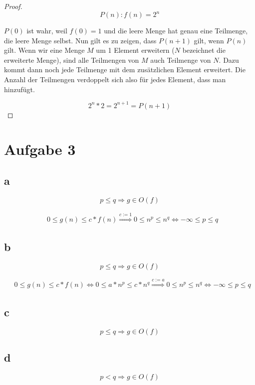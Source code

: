 \documentclass[a4paper,10pt]{article}
\begin{document}
\begin{proof}
 \begin{equation*}
  P(n): f(n) = 2^n
 \end{equation*}

 $P(0)$ ist wahr, weil $f(0) = 1$ und die leere Menge hat genau eine Teilmenge, die leere Menge selbst.
 Nun gilt es zu zeigen, dass $P(n + 1)$ gilt, wenn $P(n)$ gilt.
 Wenn wir eine Menge $M$ um 1 Element erweitern ($N$ bezeichnet die erweiterte Menge), sind alle Teilmengen von $M$ auch Teilmenge von $N$.
 Dazu kommt dann noch jede Teilmenge mit dem zusätzlichen Element erweitert.
 Die Anzahl der Teilmengen verdoppelt sich also für jedes Element, dass man hinzufügt.

 \begin{equation*}
  2^n * 2 = 2^{n + 1} = P(n + 1)
 \end{equation*}
\end{proof}

\section*{Aufgabe 3}

\subsection*{a}

\begin{equation*}
 p \le q \Rightarrow g \in O(f)
\end{equation*}

\begin{align*}
 & 0 \le g(n) \le c * f(n)
 \overset{c := 1}{\Rightarrow} 0 \le n^p \le n^q
 \Leftrightarrow -\infty \le p \le q
\end{align*}

\subsection*{b}

\begin{equation*}
 p \le q \Rightarrow g \in O(f)
\end{equation*}

\begin{align*}
 & 0 \le g(n) \le c * f(n)
 \Leftrightarrow 0 \le a * n^p \le c * n^q
 \overset{c := a}{\Rightarrow} 0 \le n^p \le n^q
 \Leftrightarrow -\infty \le p \le q
\end{align*}

\subsection*{c}

\begin{equation*}
 p \le q \Rightarrow g \in O(f)
\end{equation*}

\subsection*{d}

\begin{equation*}
 p < q \Rightarrow g \in O(f)
\end{equation*}
\end{document}

